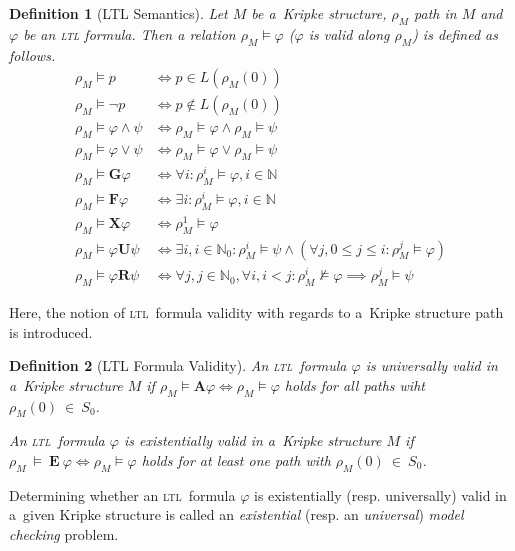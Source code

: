 \documentclass[12pt,twoside,draft]{fithesis}
\newcommand{\ltl}{\textsc{ltl}~}
\newcommand{\mNatural}{\mathbb{N}}
\newcommand{\bF}{\mathbf{F}}
\newcommand{\bG}{\mathbf{G}}
\newcommand{\bX}{\mathbf{X}}
\newcommand{\bU}{\mathbf{U}}
\newcommand{\bR}{\mathbf{R}}
\newcommand{\bA}{\mathbf{A}}
\newcommand{\bE}{\mathbf{E}}
\newtheorem{mydef}{Definition}
\begin{document}
\begin{mydef}[LTL Semantics]
Let $M$ be a~Kripke structure, $\rho_M$ path in $M$ and $\varphi$ be
an \textsc{ltl} formula. Then a relation $\rho_M\models\varphi$
($\varphi$ is valid along $\rho_M$) is defined as follows\cite{clarke}.
\begin{align}
	\rho_M\models p&\iff p\in L(\rho_M(0))\\
	\rho_M\models\neg p&\iff p\notin L(\rho_M(0))\\
	\rho_M\models \varphi\wedge\psi&\iff\rho_M\models\varphi\wedge
		\rho_M\models\psi\\
	\rho_M\models \varphi\vee\psi&\iff\rho_M\models\varphi\vee
		\rho_M\models\psi\\
	\rho_M\models\bG\varphi&\iff\forall i:\rho_M^i\models\varphi,
		i\in\mNatural\\
	\rho_M\models\bF\varphi&\iff\exists i:\rho_M^i\models\varphi,
		i\in\mNatural\\
	\rho_M\models\bX\varphi&\iff\rho_M^1\models\varphi\\
	\rho_M\models\varphi\bU\psi&\iff\exists i,i\in\mNatural_0:
		\rho_M^i\models\psi\wedge(\forall j,0\leq j\leq i:
			\rho_M^j\models\varphi)\\
	\rho_M\models\varphi\bR\psi&\iff\forall j,j\in\mNatural_0,
		\forall i,i<j:\rho_M^i\not\models\varphi\implies
			\rho_M^j\models\psi
\end{align}
\end{mydef}

Here, the notion of \ltl formula validity with regards to a~Kripke
structure path is introduced.
\begin{mydef}[LTL Formula Validity]
An \ltl formula $\varphi$ is universally valid in a~Kripke structure $M$
if $\rho_M\models\bA\varphi\iff\rho_M\models\varphi$ holds for all
paths wiht $\rho_M(0)~\in~S_0$.

An \ltl formula $\varphi$ is existentially valid in a~Kripke structure
$M$ if $\rho_M~\models~\bE~\varphi\iff\rho_M\models\varphi$ holds for
at least one path with $\rho_M(0)~\in~S_0$\cite{biere}.
\end{mydef}

Determining whether an \ltl formula $\varphi$ is existentially (resp.
universally) valid in a~given Kripke structure is called an
\emph{existential} (resp. an \emph{universal}) \emph{model checking}
problem\cite{biere}.
\end{document}
